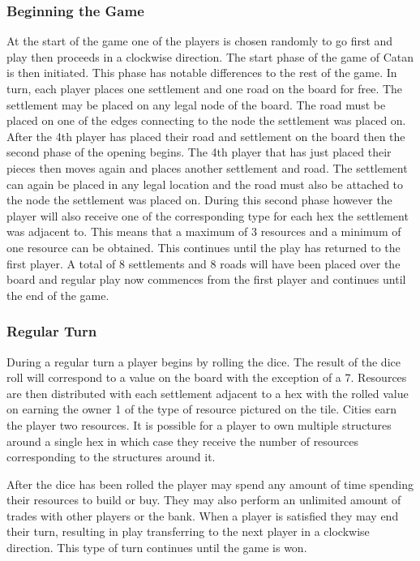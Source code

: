 \documentclass[]{article}
\begin{document}
\subsubsection{Beginning the Game}
At the start of the game one of the players is chosen randomly to go first and play then proceeds in a clockwise direction. The start phase of the game of Catan is then initiated. This phase has notable differences to the rest of the game. In turn, each player places one settlement and one road on the board for free. The settlement may be placed on any legal node of the board. The road must be placed on one of the edges connecting to the node the settlement was placed on. After the 4th player has placed their road and settlement on the board then the second phase of the opening begins. The 4th player that has just placed their pieces then moves again and places another settlement and road. The settlement can again be placed in any legal location and the road must also be attached to the node the settlement was placed on. During this second phase however the player will also receive one of the corresponding type for each hex the settlement was adjacent to. This means that a maximum of 3 resources and a minimum of one resource can be obtained. This continues until the play has returned to the first player. A total of 8 settlements and 8 roads will have been placed over the board and regular play now commences from the first player and continues until the end of the game.

\subsubsection{Regular Turn}
During a regular turn a player begins by rolling the dice. The result of the dice roll will correspond to a value on the board with the exception of a 7. Resources are then distributed with each settlement adjacent to a hex with the rolled value on earning the owner 1 of the type of resource pictured on the tile. Cities earn the player two resources. It is possible for a player to own multiple structures around a single hex in which case they receive the number of resources corresponding to the structures around it.

\par After the dice has been rolled the player may spend any amount of time spending their resources to build or buy. They may also perform an unlimited amount of trades with other players or the bank. When a player is satisfied they may end their turn, resulting in play transferring to the next player in a clockwise direction. This type of turn continues until the game is won.
\end{document}
